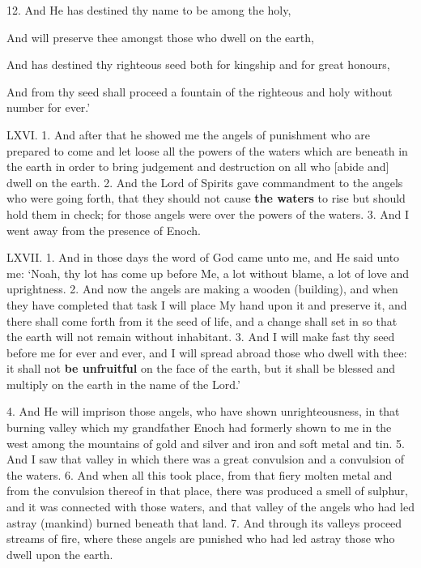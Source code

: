 12. And He has destined thy name to be among the holy,

And will preserve thee amongst those who dwell on the earth,

And has destined thy righteous seed both for kingship and for great honours,

And from thy seed shall proceed a fountain of the righteous and holy without number for ever.’


LXVI. 1. And after that he showed me the angels
of punishment who are prepared to come and let
loose all the powers of the waters which are beneath
in the earth in order to bring judgement and destruction
on all who [abide and] dwell on the earth. 2.
And the Lord of Spirits gave commandment to the
angels who were going forth, that they should not
cause \textbf{the waters} to rise but should hold them in
check; for those angels were over the powers of the
waters. 3. And I went away from the presence of
Enoch.


LXVII. 1. And in those days the word of God
came unto me, and He said unto me: ‘Noah, thy
lot has come up before Me, a lot without blame, a lot
of love and uprightness. 2. And now the angels are
making a wooden (building), and when they have
completed that task I will place My hand upon it and
preserve it, and there shall come forth from it the
seed of life, and a change shall set in so that the earth
will not remain without inhabitant. 3. And I will
make fast thy seed before me for ever and ever, and
I will spread abroad those who dwell with thee: it
shall not \textbf{be unfruitful} on the face of the earth, but
it shall be blessed and multiply on the earth in the
name of the Lord.’

4. And He will imprison those angels, who have
shown unrighteousness, in that burning valley which
my grandfather Enoch had formerly shown to me in
the west among the mountains of gold and silver and
iron and soft metal and tin. 5. And I saw that
valley in which there was a great convulsion and a
convulsion of the waters. 6. And when all this took
place, from that fiery molten metal and from the
convulsion thereof in that place, there was produced
a smell of sulphur, and it was connected with those
waters, and that valley of the angels who had led
astray (mankind) burned beneath that land. 7.
And through its valleys proceed streams of fire, where
these angels are punished who had led astray those
who dwell upon the earth.

